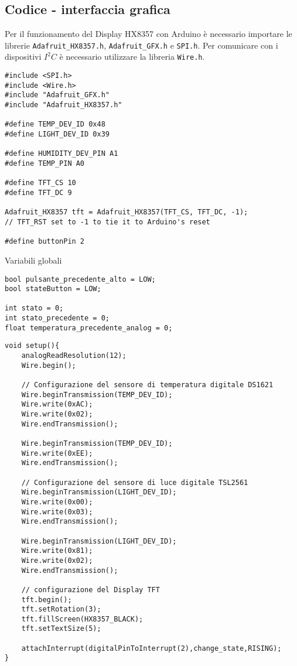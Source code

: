 \subsection{Codice - interfaccia grafica}
Per il funzionamento del Display HX8357 con Arduino è necessario importare le librerie \texttt{Adafruit\_HX8357.h}, \texttt{Adafruit\_GFX.h} e \texttt{SPI.h}. Per comunicare con i dispositivi $I^2C$ è necessario utilizzare la libreria \texttt{Wire.h}. 
\begin{lstlisting}[frame=single, language=Arduino]
#include <SPI.h>
#include <Wire.h>
#include "Adafruit_GFX.h"
#include "Adafruit_HX8357.h"

#define TEMP_DEV_ID 0x48
#define LIGHT_DEV_ID 0x39

#define HUMIDITY_DEV_PIN A1
#define TEMP_PIN A0

#define TFT_CS 10
#define TFT_DC 9

Adafruit_HX8357 tft = Adafruit_HX8357(TFT_CS, TFT_DC, -1); 
// TFT_RST set to -1 to tie it to Arduino's reset

#define buttonPin 2
\end{lstlisting}
Variabili globali
\begin{lstlisting}[frame=single, language=Arduino]
bool pulsante_precedente_alto = LOW;
bool stateButton = LOW;

int stato = 0;
int stato_precedente = 0;
float temperatura_precedente_analog = 0;
\end{lstlisting}
\begin{lstlisting}[frame=single, language=Arduino]
void setup(){
    analogReadResolution(12);
    Wire.begin();

    // Configurazione del sensore di temperatura digitale DS1621
    Wire.beginTransmission(TEMP_DEV_ID);
    Wire.write(0xAC);
    Wire.write(0x02);
    Wire.endTransmission();

    Wire.beginTransmission(TEMP_DEV_ID);
    Wire.write(0xEE);
    Wire.endTransmission();

    // Configurazione del sensore di luce digitale TSL2561
    Wire.beginTransmission(LIGHT_DEV_ID);
    Wire.write(0x00);
    Wire.write(0x03);
    Wire.endTransmission();

    Wire.beginTransmission(LIGHT_DEV_ID);
    Wire.write(0x81);
    Wire.write(0x02);
    Wire.endTransmission();

    // configurazione del Display TFT
    tft.begin();
    tft.setRotation(3);
    tft.fillScreen(HX8357_BLACK);
    tft.setTextSize(5);

    attachInterrupt(digitalPinToInterrupt(2),change_state,RISING);
}
\end{lstlisting}
